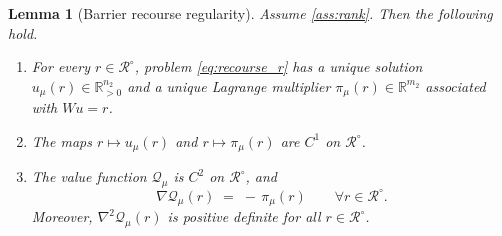 \documentclass[11pt]{article}
\newcommand{\R}{\mathbb{R}}
\theoremstyle{plain}
\newtheorem{lemma}{Lemma}
\theoremstyle{definition}
\begin{document}
\begin{lemma}[Barrier recourse regularity]\label{lem:recourse_reg}
Assume \ref{ass:rank}. Then the following hold.
\begin{enumerate}[label=\textup{(\roman*)}]
\item For every $r\in\mathcal{R}^\circ$, problem \eqref{eq:recourse_r} has a unique solution
$u_\mu(r)\in\R^{n_2}_{>0}$ and a unique Lagrange multiplier $\pi_\mu(r)\in\R^{m_2}$ associated with $Wu=r$.
\item The maps $r\mapsto u_\mu(r)$ and $r\mapsto \pi_\mu(r)$ are $C^1$ on $\mathcal{R}^\circ$.
\item The value function $\mathcal{Q}_\mu$ is $C^2$ on $\mathcal{R}^\circ$, and
\begin{equation}\label{eq:grad_Qr}
\nabla \mathcal{Q}_\mu(r) \;=\; -\,\pi_\mu(r)\qquad\forall r\in\mathcal{R}^\circ.
\end{equation}
Moreover, $\nabla^2\mathcal{Q}_\mu(r)$ is positive definite for all $r\in\mathcal{R}^\circ$.
\end{enumerate}
\end{lemma}
\end{document}
